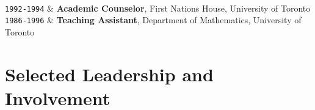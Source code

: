 \documentclass[9pt,a4paper]{article}
\newcommand{\Duration}[2]{\fontsize{10pt}{0}\selectfont \texttt{#1-#2}}
\begin{document}
\begin{EntriesTableDuration}
  \\
  \Duration{1992}{1994} & \textbf{Academic Counselor}, First Nations
  House, University of Toronto
  \\
  \Duration{1986}{1996} & \textbf{Teaching Assistant}, Department of
  Mathematics, University of Toronto
\end{EntriesTableDuration}


\section{Selected Leadership and Involvement}
\end{document}
